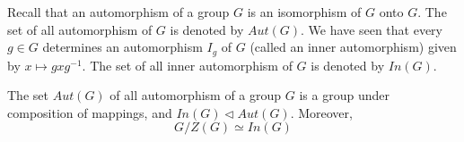 Recall that an automorphism of a group $G$ is an isomorphism of $G$ onto $G$. The set of all automorphism of $G$ is denoted by $Aut(G)$. We have seen that every $g\in G$ determines an automorphism $I_g$ of $G$ (called an inner automorphism) given by $x\mapsto gxg^{-1}$. The set of all inner automorphism of $G$ is denoted by $In(G)$.
\begin{teo}
    The set $Aut(G)$ of all automorphism of a group $G$ is a group under composition of mappings, and $In(G)\vartriangleleft Aut(G)$. Moreover, 
    \begin{equation*}
        G/Z(G)\simeq In(G)
    \end{equation*}
\end{teo}